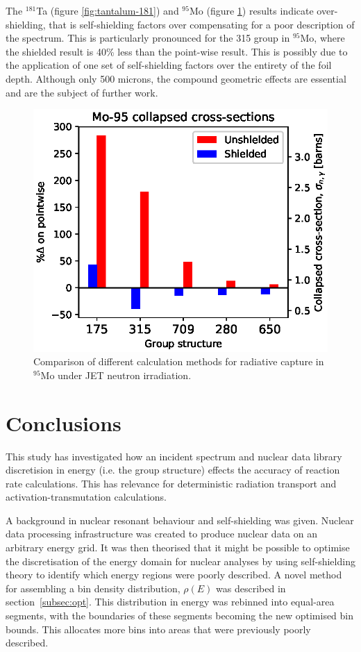 The $^{181}$Ta (figure \ref{fig:tantalum-181}) and $^{95}$Mo (figure \ref{fig:molybdenum-95}) results indicate over-shielding, that is self-shielding factors over compensating for a poor description of the spectrum. This is particularly pronounced for the 315 group in $^{95}$Mo, where the shielded result is 40\% less than the point-wise result. This is possibly due to the application of one set of self-shielding factors over the entirety of the foil depth. Although only 500 microns, the compound geometric effects are essential and are the subject of further work.

\begin{figure}[H]
  \centering
  \includegraphics[width=0.8\linewidth]{Mo-95.eps}
  \caption{Comparison of different calculation methods for radiative capture in $^{95}$Mo under JET neutron irradiation.}
  \label{fig:molybdenum-95}
\end{figure}

\section{Conclusions}
This study has investigated how an incident spectrum and nuclear data library discretision in energy (i.e. the group structure) effects the accuracy of reaction rate calculations. This has relevance for deterministic radiation transport and activation-transmutation calculations.

A background in nuclear resonant behaviour and self-shielding was given. Nuclear data processing infrastructure was created to produce nuclear data on an arbitrary energy grid. It was then theorised that it might be possible to optimise the discretisation of the energy domain for nuclear analyses by using self-shielding theory to identify which energy regions were poorly described. A novel method for assembling a bin density distribution, $\rho(E)$ was described in section~\ref{subsec:opt}. This distribution in energy was rebinned into equal-area segments, with the boundaries of these segments becoming the new optimised bin bounds. This allocates more bins into areas that were previously poorly described.

